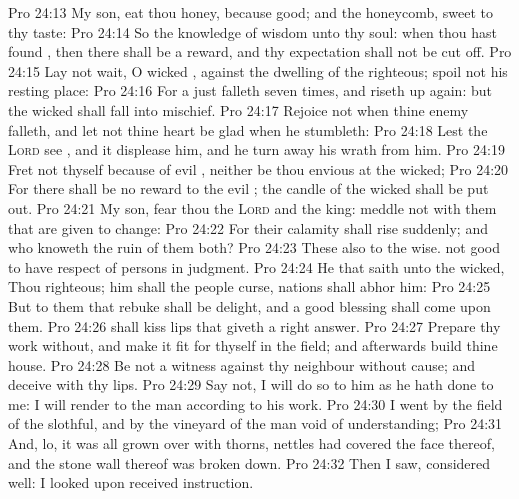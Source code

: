 \vs Pro 24:13 My son, eat thou honey, because  good; and the honeycomb,  sweet to thy taste:
\vs Pro 24:14 So  the knowledge of wisdom  unto thy soul: when thou hast found , then there shall be a reward, and thy expectation shall not be cut off.
\vs Pro 24:15 Lay not wait, O wicked , against the dwelling of the righteous; spoil not his resting place:
\vs Pro 24:16 For a just  falleth seven times, and riseth up again: but the wicked shall fall into mischief.
\vs Pro 24:17 Rejoice not when thine enemy falleth, and let not thine heart be glad when he stumbleth:
\vs Pro 24:18 Lest the \textsc{Lord} see , and it displease him, and he turn away his wrath from him.
\vs Pro 24:19 Fret not thyself because of evil , neither be thou envious at the wicked;
\vs Pro 24:20 For there shall be no reward to the evil ; the candle of the wicked shall be put out.
\vs Pro 24:21 My son, fear thou the \textsc{Lord} and the king:  meddle not with them that are given to change:
\vs Pro 24:22 For their calamity shall rise suddenly; and who knoweth the ruin of them both?
\vs Pro 24:23 These  also  to the wise.  not good to have respect of persons in judgment.
\vs Pro 24:24 He that saith unto the wicked, Thou  righteous; him shall the people curse, nations shall abhor him:
\vs Pro 24:25 But to them that rebuke  shall be delight, and a good blessing shall come upon them.
\vs Pro 24:26  shall kiss  lips that giveth a right answer.
\vs Pro 24:27 Prepare thy work without, and make it fit for thyself in the field; and afterwards build thine house.
\vs Pro 24:28 Be not a witness against thy neighbour without cause; and deceive  with thy lips.
\vs Pro 24:29 Say not, I will do so to him as he hath done to me: I will render to the man according to his work.
\vs Pro 24:30 I went by the field of the slothful, and by the vineyard of the man void of understanding;
\vs Pro 24:31 And, lo, it was all grown over with thorns,  nettles had covered the face thereof, and the stone wall thereof was broken down.
\vs Pro 24:32 Then I saw,  considered  well: I looked upon  received instruction.
